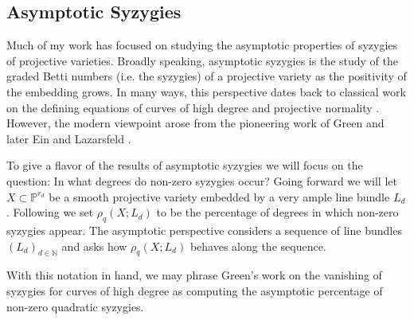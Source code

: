 \documentclass[11pt,reqno]{amsart}
\newtheorem{theorem}[lemma]{Theorem}
\theoremstyle{remark}
\newcommand{\N}{\mathbb{N}}
\renewcommand{\P}{\mathbb{P}}
\begin{document}

\subsection{Asymptotic Syzygies}

Much of my work has focused on studying the asymptotic properties of syzygies of projective varieties. Broadly speaking, asymptotic syzygies is the study of the graded Betti numbers (i.e. the syzygies) of a projective variety as the positivity of the embedding grows. In many ways, this perspective dates back to classical work on the defining equations of curves of high degree and projective normality \cite{mumford66, mumford70}. However, the modern viewpoint arose from the pioneering work of Green \cite{green84-I, green84-II} and later Ein and Lazarsfeld \cite{einLazarsfeld12}. 

To give a flavor of the results of asymptotic syzygies we will focus on the question: In what degrees do non-zero syzygies occur? Going forward we will let $X\subset \P^{r_{d}}$ be a smooth projective variety embedded by a very ample line bundle $L_{d}$. Following \cite{ermanYang18} we set $\rho_q\left(X;L_{d}\right)$ to be the percentage of degrees in which non-zero syzygies appear. The asymptotic perspective considers a sequence of line bundles $(L_{d})_{d\in \N}$ and asks how $\rho_{q}(X;L_{d})$ behaves along the sequence. 

With this notation in hand, we may phrase Green's work on the vanishing of syzygies for curves of high degree as computing the asymptotic percentage of non-zero quadratic syzygies. 
\end{document}
